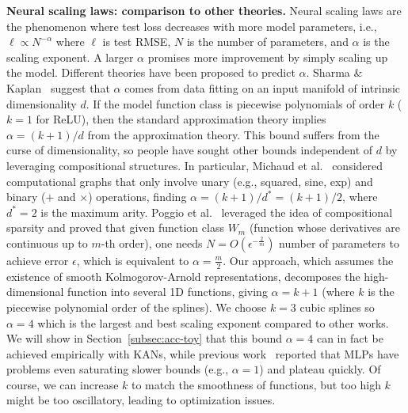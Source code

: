\documentclass{article}
\numberwithin{equation}{section}
\numberwithin{figure}{section}
\begin{document}
{\bf Neural scaling laws: comparison to other theories.} Neural scaling laws are the phenomenon where test loss decreases with more model parameters, i.e., $\ell\propto N^{-\alpha}$ where $\ell$ is test RMSE, $N$ is the number of parameters, and $\alpha$ is the scaling exponent. A larger $\alpha$ promises more improvement by simply scaling up the model. Different theories have been proposed to predict $\alpha$. Sharma \& Kaplan~\cite{sharma2020neural} suggest that $\alpha$ comes from data fitting on an input manifold of intrinsic dimensionality $d$. If the model function class is piecewise polynomials of order $k$ ($k=1$ for ReLU), then the standard approximation theory implies $\alpha=(k+1)/d$ from the approximation theory. This bound suffers from the curse of dimensionality, so people have sought other bounds independent of $d$ by leveraging compositional structures. In particular, Michaud et al.~\cite{michaud2023precision} considered computational graphs that only involve unary (e.g., squared, sine, exp) and binary ($+$ and $\times$) operations, finding $\alpha=(k+1)/d^*=(k+1)/2$, where $d^*=2$ is the maximum arity. Poggio et al.~\cite{poggio2020theoretical} leveraged the idea of compositional sparsity and proved that given function class $W_m$ (function whose derivatives are continuous up to $m$-th order), one needs $N=O(\epsilon^{-\frac{2}{m}})$ number of parameters to achieve error $\epsilon$, which is equivalent to $\alpha=\frac{m}{2}$. Our approach, which assumes the existence of smooth Kolmogorov-Arnold representations, decomposes the high-dimensional function into several 1D functions, giving $\alpha=k+1$ (where $k$ is the piecewise polynomial order of the splines). We choose $k=3$ cubic splines so $\alpha=4$ which is the largest and best scaling exponent compared to other works. We will show in Section~\ref{subsec:acc-toy} that this bound $\alpha=4$ can in fact be achieved empirically with KANs, while previous work~\cite{michaud2023precision} reported that MLPs have problems even saturating slower bounds (e.g., $\alpha=1$) and plateau quickly. Of course, we can increase $k$ to match the smoothness of functions, but too high $k$ might be too oscillatory, leading to optimization issues.
\end{document}
